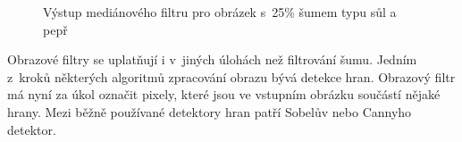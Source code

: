 \begin{figure}[htb]
    \centering
    \caption{Výstup mediánového filtru pro obrázek s~25\% šumem typu sůl a pepř}
    \label{obrMedian}
\end{figure}

Obrazové filtry se uplatňují i v~jiných úlohách než filtrování šumu. Jedním z~kroků některých algoritmů zpracování obrazu bývá detekce hran. Obrazový filtr má nyní za úkol označit pixely, které jsou ve vstupním obrázku součástí nějaké hrany. Mezi běžně používané detektory hran patří Sobelův nebo Cannyho detektor.

